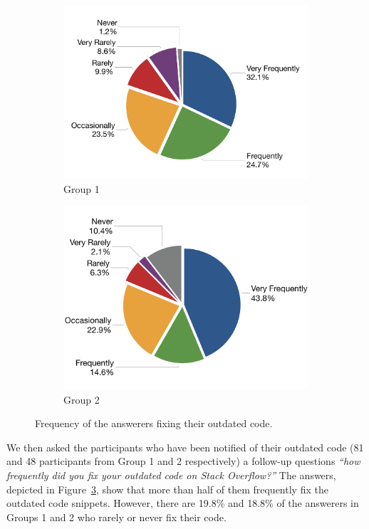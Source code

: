 \documentclass{svjour3}                     %
\begin{document}
\begin{figure}
	\begin{subfigure}{.5\textwidth}
		\centering
		\includegraphics[width=.8\linewidth]{survey_outdated_fix_1}
		\caption{Group 1}
		\label{fig:survey_outdated_fix_1}
	\end{subfigure}%
	\begin{subfigure}{.5\textwidth}
		\centering
		\includegraphics[width=.8\linewidth]{survey_outdated_fix_2}
		\caption{Group 2}
		\label{fig:survey_outdated_fix_2}
	\end{subfigure}
	\caption{Frequency of the answerers fixing their outdated code.}
	\label{fig:survey_outdated_fix}
\end{figure}

We then asked the participants who have been notified of their outdated code
(81 and 48 participants from Group 1 and 2 respectively) a
follow-up questions \textit{``how frequently did you fix your outdated code on Stack
Overflow?''} The answers, depicted in Figure~\ref{fig:survey_outdated_fix}, show that
more than half of them frequently fix the outdated code snippets. However, there
are 19.8\% and 18.8\% of the answerers in Groups 1 and 2 who rarely or never fix their code.
\end{document}
